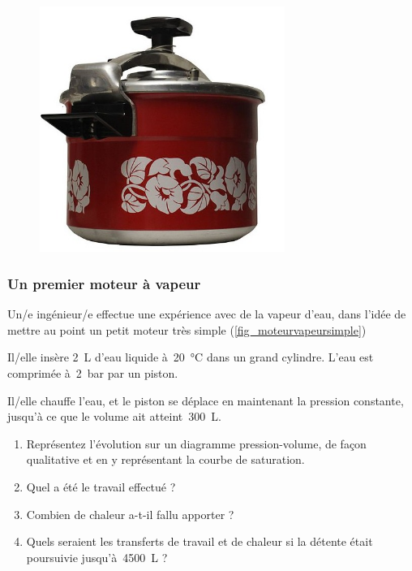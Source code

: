 	\begin{figure}[htp] %
		\begin{center}
			\includegraphics[width=8cm, max width=0.65\columnwidth]{images/exercice_super_cocotte}
		\end{center}
		\label{fig_cocotte}
	\end{figure}


\subsubsection{Un premier moteur à vapeur}
\label{exo_moteur_basique_vapeur}

	Un/e ingénieur/e effectue une expérience avec de la vapeur d’eau, dans l’idée de mettre au point un petit moteur très simple (\cref{fig_moteurvapeursimple})
	
	Il/elle insère \SI{2}{\liter} d’eau liquide à~\SI{20}{\degreeCelsius} dans un grand cylindre. L’eau est comprimée à~\SI{2}{\bar} par un piston.
	
	Il/elle chauffe l’eau, et le piston se déplace en maintenant la pression constante, jusqu’à ce que le volume ait atteint~\SI{300}{\liter}.
	
	\begin{enumerate}
		\item Représentez l’évolution sur un diagramme pression-volume, de façon qualitative et en y représentant la courbe de saturation.
		\item Quel a été le travail effectué ?
		\item Combien de chaleur a-t-il fallu apporter ?
		\item Quels seraient les transferts de travail et de chaleur si la détente était poursuivie jusqu’à~\SI{4500}{\liter} ?
	\end{enumerate}

